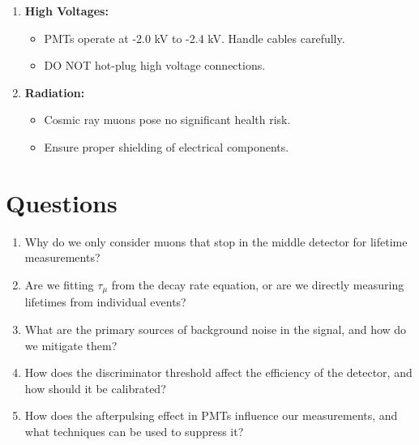 \documentclass[aps,prb,onecolumn,11pt,superscriptaddress,floatfix,longbibliography]{revtex4-2}
\begin{document}
\begin{enumerate}
    \item \textbf{High Voltages:}  
    \begin{itemize}
        \item PMTs operate at -2.0 kV to -2.4 kV. Handle cables carefully.
        \item DO NOT hot-plug high voltage connections.
    \end{itemize}
    \item \textbf{Radiation:}  
    \begin{itemize}
        \item Cosmic ray muons pose no significant health risk.
        \item Ensure proper shielding of electrical components.
    \end{itemize}
\end{enumerate}

\section{\label{sec:questions}Questions}

\begin{enumerate}
    \item Why do we only consider muons that stop in the middle detector for lifetime measurements?
    \item Are we fitting \(\tau_\mu\) from the decay rate equation, or are we directly measuring lifetimes from individual events?
    \item What are the primary sources of background noise in the signal, and how do we mitigate them?
    \item How does the discriminator threshold affect the efficiency of the detector, and how should it be calibrated?
    \item How does the afterpulsing effect in PMTs influence our measurements, and what techniques can be used to suppress it?
\end{enumerate}


% 
\end{document}
